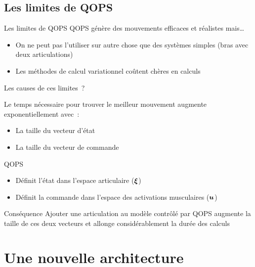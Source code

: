 \subsection{Les limites de QOPS}

\begin{frame}{Les limites de QOPS}
    QOPS génère des mouvements efficaces et réalistes mais\dots
    \begin{itemize}
        \item On ne peut pas l'utiliser sur autre chose que des systèmes simples (bras avec deux articulations)
        \item Les méthodes de calcul variationnel coûtent chères en calculs
    \end{itemize}
\end{frame}

\begin{frame}{Les causes de ces limites~?}
    \begin{small}
        Le temps nécessaire pour trouver le meilleur mouvement augmente exponentiellement avec~:
        \begin{itemize}
            \item La taille du vecteur d'état
            \item La taille du vecteur de commande
        \end{itemize}
        \begin{block}{QOPS}
            \begin{itemize}
                \item Définit l'état dans l'espace articulaire ($\boldsymbol{\xi}$)
                \item Définit la commande dans l'espace des activations musculaires ($\boldsymbol{u}$)
            \end{itemize}
        \end{block}
        \begin{block}{Conséquence}
            Ajouter une articulation au modèle contrôlé par QOPS augmente la taille de
            ces deux vecteurs et allonge considérablement la durée des calculs
        \end{block}
    \end{small}
\end{frame}


\section{Une nouvelle architecture}

